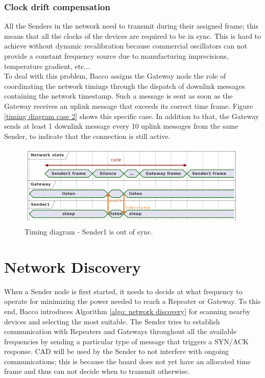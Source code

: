 \subsubsection{Clock drift compensation}
\label{clock drift compensation}
All the Senders in the network need to transmit during their assigned frame; this means
that all the clocks of the devices are required to be in sync. This is hard to achieve without dynamic recalibration
because commercial oscillators can not provide a constant frequency source due to manufacturing imprecisions,
temperature gradient, etc...\\
To deal with this problem, Bacco assigns the Gateway node the role of coordinating the network timings through
the dispatch of downlink messages containing the network timestamp. Such a message
is sent as soon as the Gateway receives an uplink message that exceeds its correct time frame. Figure \ref{timing
diagram case 2} shows this specific case. In addition to that, the Gateway sends at least 1 downlink message every 10
uplink messages from the same Sender, to indicate that the connection is still active.

\begin{figure}[ht]
    \centering
    \includegraphics[width=1.0\textwidth]{uml/timings_case2.pdf}
    \caption{Timing diagram - Sender1 is out of sync.}
    \label{timing diagram case 2}
\end{figure}

\section{Network Discovery}
\label{Network discovery}
When a Sender node is first started, it needs to decide at what frequency to operate for minimizing the power
needed to reach a Repeater or Gateway. To this end, Bacco introduces Algorithm \ref{algo: network discovery}
for scanning nearby devices and selecting the most suitable. The Sender tries to establish communication with Repeaters and
Gateways throughout all the available frequencies by sending a particular type of message that triggers a \gls{SYN/ACK}
response. \Gls{CAD} will be used by the Sender to not interfere with ongoing communications; this is because the board does
not yet have an allocated time frame and thus can not decide when to transmit otherwise.

